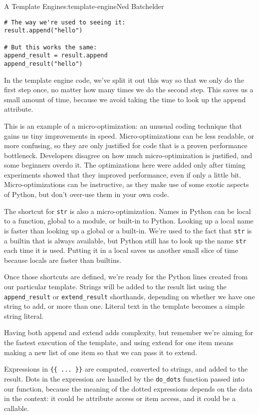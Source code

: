 \begin{aosachapter}{A Template Engine}{s:template-engine}{Ned Batchelder}
\begin{verbatim}
# The way we're used to seeing it:
result.append("hello")

# But this works the same:
append_result = result.append
append_result("hello")
\end{verbatim}

In the template engine code, we've split it out this way so that we only
do the first step once, no matter how many times we do the second step.
This saves us a small amount of time, because we avoid taking the time
to look up the append attribute.

This is an example of a micro-optimization: an unusual coding technique
that gains us tiny improvements in speed. Micro-optimizations can be
less readable, or more confusing, so they are only justified for code
that is a proven performance bottleneck. Developers disagree on how much
micro-optimization is justified, and some beginners overdo it. The
optimizations here were added only after timing experiments showed that
they improved performance, even if only a little bit.
Micro-optimizations can be instructive, as they make use of some exotic
aspects of Python, but don't over-use them in your own code.

The shortcut for \texttt{str} is also a micro-optimization. Names in
Python can be local to a function, global to a module, or built-in to
Python. Looking up a local name is faster than looking up a global or a
built-in. We're used to the fact that \texttt{str} is a builtin that is
always available, but Python still has to look up the name \texttt{str}
each time it is used. Putting it in a local saves us another small slice
of time because locals are faster than builtins.

Once those shortcuts are defined, we're ready for the Python lines
created from our particular template. Strings will be added to the
result list using the \texttt{append\_result} or \texttt{extend\_result}
shorthands, depending on whether we have one string to add, or more than
one. Literal text in the template becomes a simple string literal.

Having both append and extend adds complexity, but remember we're aiming
for the fastest execution of the template, and using extend for one item
means making a new list of one item so that we can pass it to extend.

Expressions in \texttt{\{\{ ... \}\}} are computed, converted to
strings, and added to the result. Dots in the expression are handled by
the \texttt{do\_dots} function passed into our function, because the
meaning of the dotted expressions depends on the data in the context: it
could be attribute access or item access, and it could be a callable.


\end{aosachapter}
